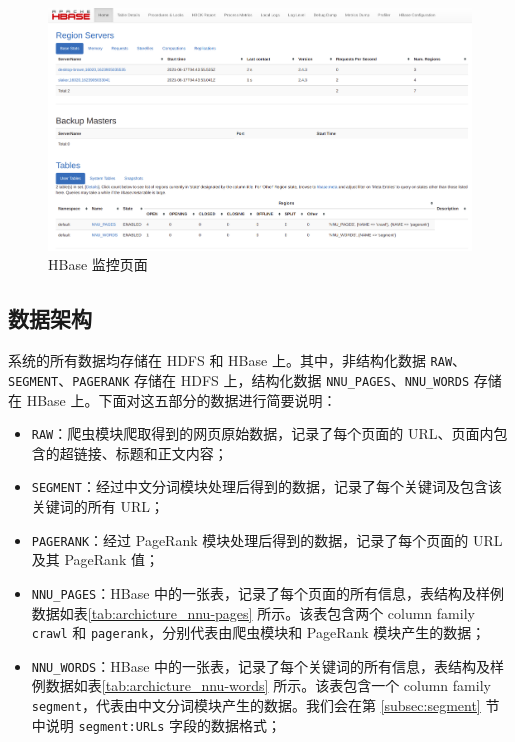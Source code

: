 \documentclass{ctexart}
\newcommand{\code}[1]{\colorbox{backcolor}{\lstinline|#1|}}
\begin{document}
    \begin{figure}[t]
        \centering
        \includegraphics[width=\textwidth]{src/archicture_hbase-web}
        \caption{HBase 监控页面}
        \label{fig:archicture_hbase-web}
    \end{figure}

    \subsection{数据架构}\label{subsec:archicture_data}

    系统的所有数据均存储在 HDFS 和 HBase 上。其中，非结构化数据 \code{RAW}、\code{SEGMENT}、\code{PAGERANK} 存储在 HDFS 上，结构化数据 \code{NNU_PAGES}、\code{NNU_WORDS} 存储在 HBase 上。下面对这五部分的数据进行简要说明：

    \begin{itemize}
        \item \code{RAW}：爬虫模块爬取得到的网页原始数据，记录了每个页面的 URL、页面内包含的超链接、标题和正文内容；
        \item \code{SEGMENT}：经过中文分词模块处理后得到的数据，记录了每个关键词及包含该关键词的所有 URL；
        \item \code{PAGERANK}：经过 PageRank 模块处理后得到的数据，记录了每个页面的 URL 及其 PageRank 值；
        \item \code{NNU_PAGES}：HBase 中的一张表，记录了每个页面的所有信息，表结构及样例数据如表\ref{tab:archicture_nnu-pages} 所示。该表包含两个 column family \code{crawl} 和 \code{pagerank}，分别代表由爬虫模块和 PageRank 模块产生的数据；
        \item \code{NNU_WORDS}：HBase 中的一张表，记录了每个关键词的所有信息，表结构及样例数据如表\ref{tab:archicture_nnu-words} 所示。该表包含一个 column family \code{segment}，代表由中文分词模块产生的数据。我们会在第 \ref{subsec:segment} 节中说明 \code{segment:URLs} 字段的数据格式；
    \end{itemize}
\end{document}

